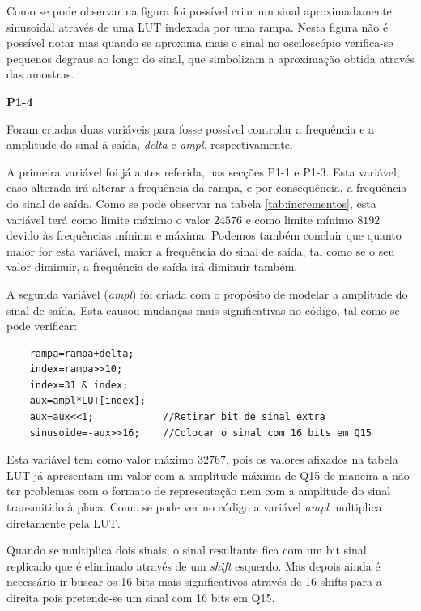 \documentclass[11pt]{article}
\begin{document}
Como se pode observar na figura foi possível criar um sinal aproximadamente sinusoidal através de uma LUT indexada por uma rampa. Nesta figura não é possível notar mas quando se aproxima mais o sinal no osciloscópio verifica-se pequenos degraus ao longo do sinal, que simbolizam a aproximação obtida através das amostras.
\vspace{2 mm}

\textbf{P1-4}
\label{para:P1-4}

Foram criadas duas variáveis para fosse possível controlar a frequência e a amplitude do sinal à saída, \textit{delta} e \textit{ampl}, respectivamente.

A primeira variável foi já antes referida, nas secções P1-1 e P1-3. Esta variável, caso alterada irá alterar a frequência da rampa, e por consequência, a frequência do sinal de saída. Como se pode observar na tabela \ref{tab:incrementos}, esta variável terá como limite máximo o valor $ 24576 $ e como limite mínimo $ 8192 $ devido às frequências mínima e máxima. Podemos também concluir que quanto maior for esta variável, maior a frequência do sinal de saída, tal como se o seu valor diminuir, a frequência de saída irá diminuir também.

A segunda variável (\textit{ampl}) foi criada com o propósito de modelar a amplitude do sinal de saída. Esta causou mudanças mais significativas no código, tal como se pode verificar:

\begin{lstlisting}
	rampa=rampa+delta;
	index=rampa>>10;
	index=31 & index;        
	aux=ampl*LUT[index];
	aux=aux<<1;            //Retirar bit de sinal extra
	sinusoide=-aux>>16;    //Colocar o sinal com 16 bits em Q15
\end{lstlisting}

Esta variável tem como valor máximo $ 32767 $, pois os valores afixados na tabela LUT já apresentam um valor com a amplitude máxima de Q15 de maneira a não ter problemas com o formato de representação nem com a amplitude do sinal transmitido à placa.
Como se pode ver no código a variável \textit{ampl} multiplica diretamente pela LUT. 
\vspace{2 mm}

Quando se multiplica dois sinais, o sinal resultante fica com um bit sinal replicado que é eliminado através de um \textit{shift} esquerdo. Mas depois ainda é necessário ir buscar os 16 bits mais significativos através de 16 shifts para a direita pois pretende-se um sinal com 16 bits em Q15. 
\end{document}
